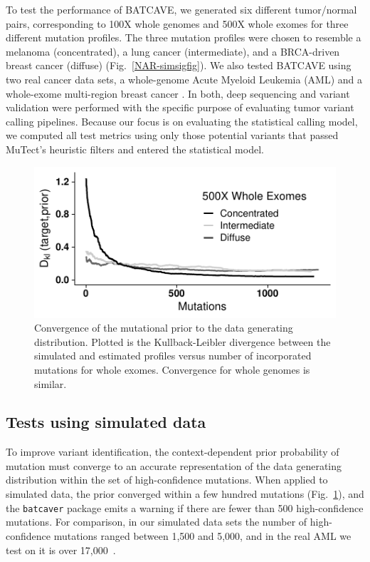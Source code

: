 \documentclass[a4,center,fleqn]{NAR}
\newcommand{\batcave}{BATCAVE\xspace}
\begin{document}
To test the performance of \batcave, we generated six different tumor/normal pairs, corresponding to 100X whole genomes and 500X whole exomes for three different mutation profiles.
The three mutation profiles were chosen to resemble a melanoma (concentrated), a lung cancer (intermediate), and a BRCA-driven breast cancer (diffuse) (Fig.~\ref{NAR-simsigfig}).
We also tested \batcave using two real cancer data sets, a whole-genome Acute Myeloid Leukemia (AML) \cite{Griffith2015} and a whole-exome multi-region breast cancer \cite{Shi2018}.
In both, deep sequencing and variant validation were performed with the specific purpose of evaluating tumor variant calling pipelines.
Because our focus is on evaluating the statistical calling model, we computed all test metrics using only those potential variants that passed MuTect's heuristic filters and entered the statistical model.

\begin{figure}
\centering
  \includegraphics{figures/kl_only.pdf}
  \caption{Convergence of the mutational prior to the data generating distribution. Plotted is the Kullback-Leibler divergence between the simulated and estimated profiles versus number of incorporated mutations for whole exomes. Convergence for whole genomes is similar.
  }
\label{NAR-kl_fig}
\end{figure}

\subsection{Tests using simulated data}

To improve variant identification, the context-dependent prior probability of mutation must converge to an accurate representation of the data generating distribution within the set of high-confidence mutations.
When applied to simulated data, the prior converged within a few hundred mutations (Fig.~\ref{NAR-kl_fig}), and the \texttt{batcaver} package emits a warning if there are fewer than 500 high-confidence mutations.
For comparison, in our simulated data sets the number of high-confidence mutations ranged between 1,500 and 5,000, and in the real AML we test on it is over 17,000~\cite{Griffith2015}.
\end{document}
